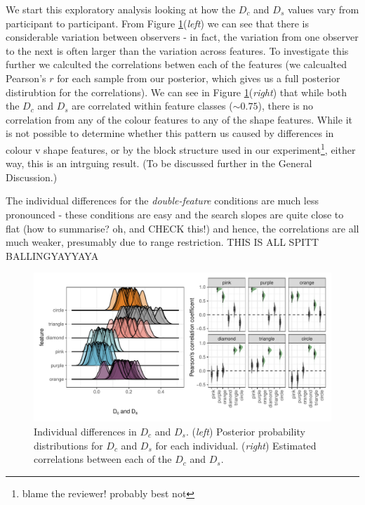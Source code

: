 \documentclass[preprint,12pt,authoryear]{elsarticle}
\begin{document}
We start this exploratory analysis looking at how the $D_c$ and $D_s$ values vary from participant to participant. From Figure \ref{fig:exp_corr}(\textit{left}) we can see that there is considerable variation between observers - in fact, the variation from one observer to the next is often larger than the variation across features. To investigate this further we calculted the correlations betwen each of the features (we calcualted Pearson's $r$ for each sample from our posterior, which gives us a full posterior distirubtion for the correlations). We can see in Figure \ref{fig:exp_corr}(\textit{right}) that while both the $D_c$ and $D_s$ are correlated within feature classes ($\sim0.75$), there is no correlation from any of the colour features to any of the shape features. While it is not possible to determine whether this pattern us caused by differences in colour v shape features, or by the block structure used in our experiment\footnote{blame the reviewer! probably best not}, either way, this is an intrguing result. (To be discussed further in the General Discussion.)

The individual differences for the \textit{double-feature} conditions are much less pronounced - these conditions are easy and the search slopes are quite close to flat (how to summarise? oh, and CHECK this!) and hence, the correlations are all much weaker, presumably due to range restriction. THIS IS ALL SPITT BALLINGYAYYAYA

\begin{figure}[ht]
\centering
\includegraphics[width=\textwidth]{../plots/single_feature_correlations.pdf}
\caption{Individual differences in $D_c$ and $D_s$. (\textit{left}) Posterior probability distributions for $D_c$ and $D_s$ for each individual. (\textit{right}) Estimated correlations between each of the $D_c$ and $D_s$.}
\label{fig:exp_corr}
\end{figure}
\end{document}
